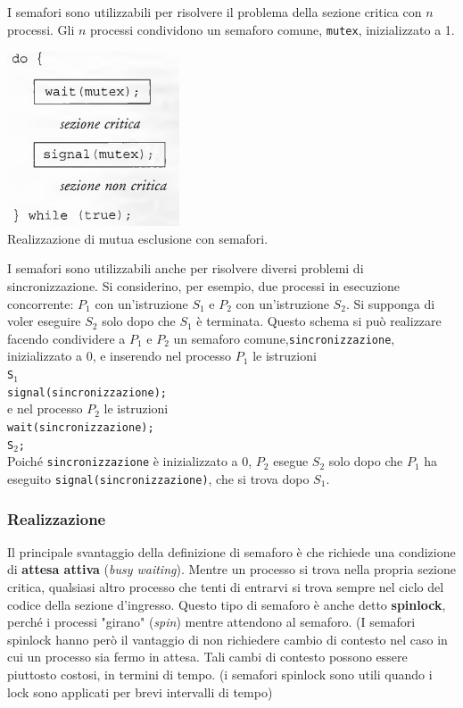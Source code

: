 \documentclass[11pt,a4paper]{article}
\begin{document}
I semafori sono utilizzabili per risolvere il problema della sezione critica con $n$ processi. Gli $n$ processi condividono un semaforo comune, \texttt{mutex}, inizializzato a 1.
\begin{center}
  \includegraphics[scale=0.6]{img/0030.png}\\
  \caption{Realizzazione di mutua esclusione con semafori.}
\end{center}
%
I semafori sono utilizzabili anche per risolvere diversi problemi di sincronizzazione. Si
considerino, per esempio, due processi in esecuzione concorrente: $P_1$ con un'istruzione $S_1$ e
$P_2$ con un'istruzione $S_2$. Si supponga di voler eseguire $S_2$ solo dopo che $S_1$ è terminata.
Questo schema si può realizzare facendo condividere a $P_1$ e $P_2$ un semaforo comune,\texttt{sincronizzazione}, inizializzato a 0, e inserendo nel processo $P_1$ le istruzioni\medskip\\
\texttt{S$_1$\\
        signal(sincronizzazione);}\medskip\\
e nel processo $P_2$ le istruzioni\medskip\\
\texttt{wait(sincronizzazione);\\
        S$_2$;}\medskip\\
%
Poiché \texttt{sincronizzazione} è inizializzato a 0, $P_2$ esegue $S_2$ solo dopo che $P_1$ ha eseguito
\texttt{signal(sincronizzazione)}, che si trova dopo $S_1$.

\subsubsection{Realizzazione}
Il principale svantaggio della definizione di semaforo è che richiede una condizione di \textbf{atte­sa attiva} (\emph{busy waiting}). Mentre un processo si trova nella propria sezione critica, qualsiasi
altro processo che tenti di entrarvi si trova sempre nel ciclo del codice della sezione d'ingres­so. Questo tipo di semaforo è anche detto \textbf{spinlock},
perché i processi "girano" (\emph{spin}) mentre attendono al semaforo. (I semafori spinlock hanno
però il vantaggio di non richiedere cambio di contesto nel caso in cui un processo sia fermo
in attesa. Tali cambi di contesto possono essere piuttosto costosi, in termini di tempo.
(i semafori spinlock sono utili quando i lock sono applicati per brevi intervalli
di tempo)
\end{document}
